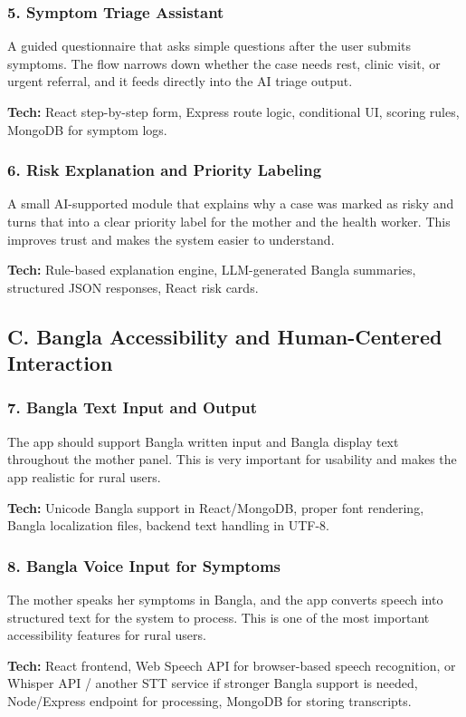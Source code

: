 \documentclass[11pt]{article}
\begin{document}
\subsubsection{5. Symptom Triage Assistant}
A guided questionnaire that asks simple questions after the user submits symptoms. The flow narrows down whether the case needs rest, clinic visit, or urgent referral, and it feeds directly into the AI triage output.

\textbf{Tech:} React step-by-step form, Express route logic, conditional UI, scoring rules, MongoDB for symptom logs.

\subsubsection{6. Risk Explanation and Priority Labeling}
A small AI-supported module that explains why a case was marked as risky and turns that into a clear priority label for the mother and the health worker. This improves trust and makes the system easier to understand.

\textbf{Tech:} Rule-based explanation engine, LLM-generated Bangla summaries, structured JSON responses, React risk cards.

\subsection{C. Bangla Accessibility and Human-Centered Interaction}

\subsubsection{7. Bangla Text Input and Output}
The app should support Bangla written input and Bangla display text throughout the mother panel. This is very important for usability and makes the app realistic for rural users.

\textbf{Tech:} Unicode Bangla support in React/MongoDB, proper font rendering, Bangla localization files, backend text handling in UTF-8.

\subsubsection{8. Bangla Voice Input for Symptoms}
The mother speaks her symptoms in Bangla, and the app converts speech into structured text for the system to process. This is one of the most important accessibility features for rural users.

\textbf{Tech:} React frontend, Web Speech API for browser-based speech recognition, or Whisper API / another STT service if stronger Bangla support is needed, Node/Express endpoint for processing, MongoDB for storing transcripts.
\end{document}
